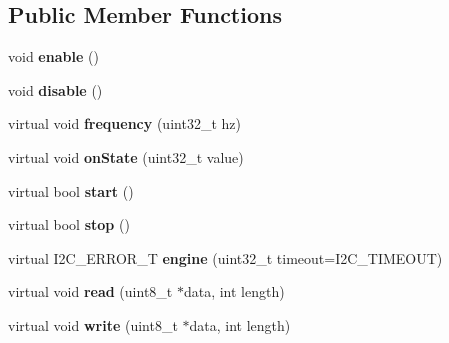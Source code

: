 \subsection*{Public Member Functions}
\begin{DoxyCompactItemize}
\item 
\hypertarget{class_c_i2_c_aeff3f958457f68d453fe125b031c4539}{void {\bfseries enable} ()}\label{class_c_i2_c_aeff3f958457f68d453fe125b031c4539}

\item 
\hypertarget{class_c_i2_c_a36a89b063ac68ff1710193258e76ea73}{void {\bfseries disable} ()}\label{class_c_i2_c_a36a89b063ac68ff1710193258e76ea73}

\item 
\hypertarget{class_c_i2_c_ab5158b0fe99495c186200ac1d6ef4e52}{virtual void {\bfseries frequency} (uint32\-\_\-t hz)}\label{class_c_i2_c_ab5158b0fe99495c186200ac1d6ef4e52}

\item 
\hypertarget{class_c_i2_c_a20801c3b9529bb0b3b29d51630a399de}{virtual void {\bfseries on\-State} (uint32\-\_\-t value)}\label{class_c_i2_c_a20801c3b9529bb0b3b29d51630a399de}

\item 
\hypertarget{class_c_i2_c_a1517b47af85f0129355d2242f124dfbc}{virtual bool {\bfseries start} ()}\label{class_c_i2_c_a1517b47af85f0129355d2242f124dfbc}

\item 
\hypertarget{class_c_i2_c_a68800b62b81e6fb291c24db5e0618e56}{virtual bool {\bfseries stop} ()}\label{class_c_i2_c_a68800b62b81e6fb291c24db5e0618e56}

\item 
\hypertarget{class_c_i2_c_ab0776700fc48c94f200774e832081c7f}{virtual I2\-C\-\_\-\-E\-R\-R\-O\-R\-\_\-\-T {\bfseries engine} (uint32\-\_\-t timeout=I2\-C\-\_\-\-T\-I\-M\-E\-O\-U\-T)}\label{class_c_i2_c_ab0776700fc48c94f200774e832081c7f}

\item 
\hypertarget{class_c_i2_c_ac1730f4db280cd2c9b0d73a03317776e}{virtual void {\bfseries read} (uint8\-\_\-t $\ast$data, int length)}\label{class_c_i2_c_ac1730f4db280cd2c9b0d73a03317776e}

\item 
\hypertarget{class_c_i2_c_a379c419607c235a7d723ab4391c2ff2c}{virtual void {\bfseries write} (uint8\-\_\-t $\ast$data, int length)}\label{class_c_i2_c_a379c419607c235a7d723ab4391c2ff2c}

\end{DoxyCompactItemize}
